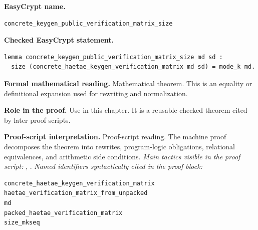 \begin{formaltheorem}
\noindent\textbf{EasyCrypt name.}
\begin{lstlisting}[language=EasyCrypt,basicstyle=\ttfamily\scriptsize]
concrete_keygen_public_verification_matrix_size
\end{lstlisting}
\noindent\textbf{Checked EasyCrypt statement.}
\begin{lstlisting}[language=EasyCrypt,basicstyle=\ttfamily\scriptsize]
lemma concrete_keygen_public_verification_matrix_size md sd :
  size (concrete_haetae_keygen_verification_matrix md sd) = mode_k md.
\end{lstlisting}
\noindent\textbf{Formal mathematical reading.}
Mathematical theorem. This is an equality or definitional expansion used for rewriting and normalization.

\noindent\textbf{Role in the proof.}
Use in this chapter. It is a reusable checked theorem cited by later proof scripts.

\noindent\textbf{Proof-script interpretation.}
Proof-script reading. The machine proof decomposes the theorem into rewrites, program-logic obligations, relational equivalences, and arithmetic side conditions.
\emph{Main tactics visible in the proof script:} , .
\emph{Named identifiers syntactically cited in the proof block:}
\begin{lstlisting}[language=EasyCrypt,basicstyle=\ttfamily\scriptsize]
concrete_haetae_keygen_verification_matrix
haetae_verification_matrix_from_unpacked
md
packed_haetae_verification_matrix
size_mkseq
\end{lstlisting}

\end{formaltheorem}

